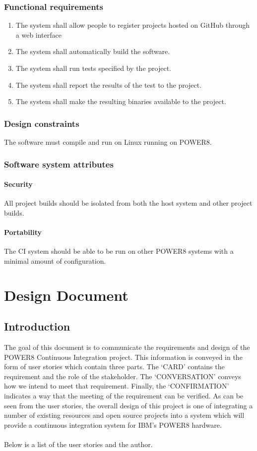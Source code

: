 \documentclass[10pt,letterpaper,onecolumn,draftclsnofoot]{IEEEtran}
\begin{document}
\subsubsection{Functional requirements}
\begin{enumerate}
\item The system shall allow people to register projects hosted on GitHub through a web interface
\item The system shall automatically build the software.
\item The system shall run tests specified by the project.
\item The system shall report the results of the test to the project.
\item The system shall make the resulting binaries available to the project.
\end{enumerate}
\subsubsection{Design constraints}
The software must compile and run on Linux running on POWER8.
\subsubsection{Software system attributes}
\paragraph{Security}
All project builds should be isolated from both the host system and other project builds.
\paragraph{Portability}
The CI system should be able to be run on other POWER8 systems with a minimal amount of configuration.

\clearpage
\section{Design Document}
\subsection{Introduction}
The goal of this document is to communicate the requirements and design of the POWER8 Continuous Integration project.
This information is conveyed in the form of user stories which contain three parts.
The `CARD' contains the requirement and the role of the stakeholder.
The `CONVERSATION' conveys how we intend to meet that requirement.
Finally, the `CONFIRMATION' indicates a way that the meeting of the requirement can be verified.
As can be seen from the user stories, the overall design of this project is one of integrating a number of existing resources and open source projects into a system which will provide a continuous integration system for IBM's POWER8 hardware.\\\\
Below is a list of the user stories and the author.\\
\end{document}
